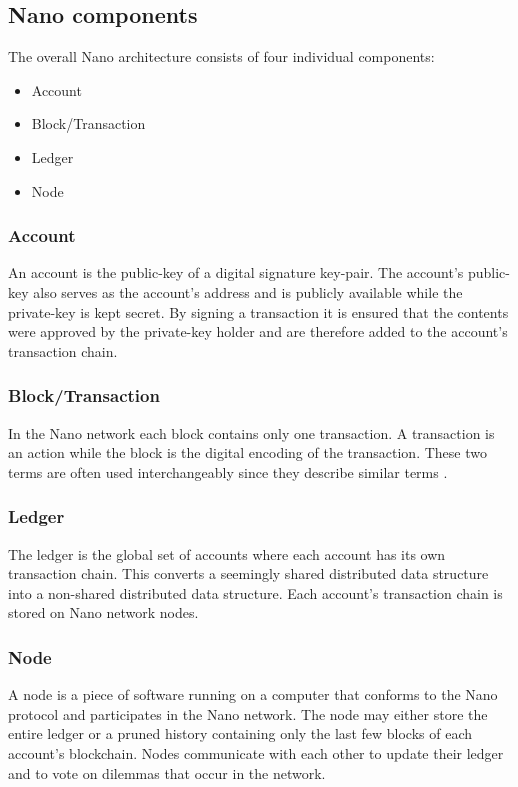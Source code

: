 \documentclass{ferseminar}
\begin{document}
\subsection{Nano components}
The overall Nano architecture consists of four individual components:
\begin{itemize}
	\item Account
	\item Block/Transaction
	\item Ledger
	\item Node
\end{itemize}

\subsubsection{Account}
An account is the public-key of a digital signature key-pair. The account's public-key also serves as the account's address and is publicly available while the private-key is kept secret. By signing a transaction it is ensured that the contents were approved by the private-key holder and are therefore added to the account's transaction chain. 

\subsubsection{Block/Transaction}
In the Nano network each block contains only one transaction. A transaction is an action while the block is the digital encoding of the transaction. These two terms are often used interchangeably since they describe similar terms \cite{Nano}.

\subsubsection{Ledger}
The ledger is the global set of accounts where each account has its own transaction chain. This converts a seemingly shared distributed data structure into a non-shared distributed data structure. Each account's transaction chain is stored on Nano network nodes.

\subsubsection{Node}
A node is a piece of software running on a computer that conforms to the Nano protocol and participates in the Nano network. The node may either store the entire ledger or a pruned history containing only the last few blocks of each account's blockchain. Nodes communicate with each other to update their ledger and to vote on dilemmas that occur in the network.
\end{document}
